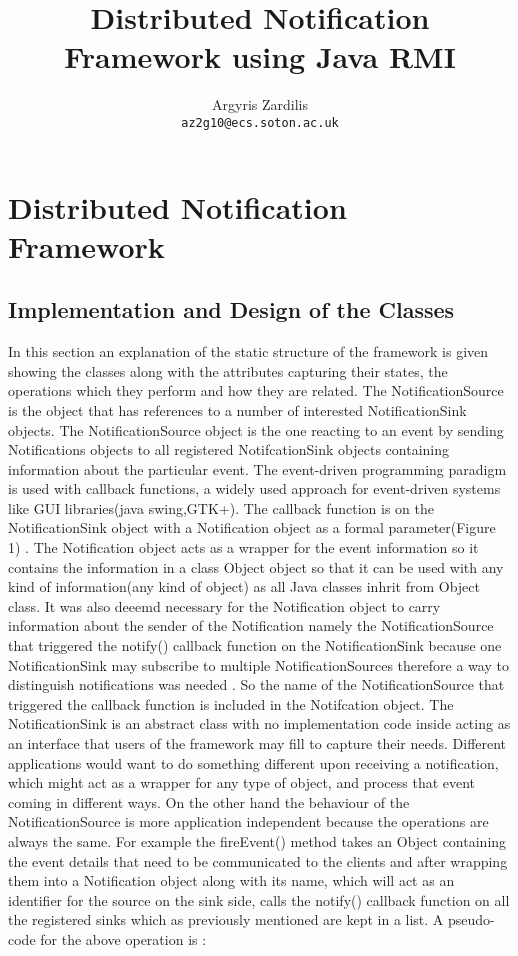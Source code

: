 \documentclass[a4paper,12pt,titlepage]{article}
\author{Argyris Zardilis\\ \texttt{az2g10@ecs.soton.ac.uk}}
\title{Distributed Notification Framework using Java RMI}
\begin{document}
\maketitle
\section{Distributed Notification Framework}
\subsection{Implementation and Design of the Classes}
In this section an explanation of the static structure of the framework is given showing the classes along with the attributes capturing their states, the operations which they perform and how they are related. The NotificationSource  is the object that has references to a number of interested NotificationSink objects. The NotificationSource object is the one reacting to an event by sending Notifications objects to all registered NotifcationSink objects containing information about the particular event. The event-driven programming paradigm is used with callback functions, a widely used approach for event-driven systems like GUI libraries(java swing,GTK+). The callback function is on the NotificationSink object with a Notification object as a formal parameter(Figure 1) . The Notification object acts as a wrapper for the event information so it contains the information in a class Object object so that it can be used with any kind of information(any kind of object) as all Java classes inhrit from Object class. It was also deeemd necessary for the Notification object to carry information about the sender of the Notification namely the NotificationSource that triggered the notify() callback function on the NotificationSink because one NotificationSink may subscribe to multiple NotificationSources therefore a way to distinguish notifications was needed . So the name of the NotificationSource that triggered the callback function is included in the Notifcation object. The NotificationSink is an abstract class with no implementation code inside acting as an interface that users of the framework may fill to capture their needs. Different applications would want to do something different upon receiving a notification, which might act as a wrapper for any type of object, and process that event coming in different ways. On the other hand the behaviour of the NotificationSource is more application independent because the operations are always the same. For example the fireEvent() method takes an Object containing the event details that need to be communicated to the clients and after wrapping them into a Notification object along with its name, which will act as an identifier for the source on the sink side, calls the notify() callback function on all the registered sinks which as previously mentioned are kept in a list. A pseudo-code for the above operation is : \\
\end{document}
